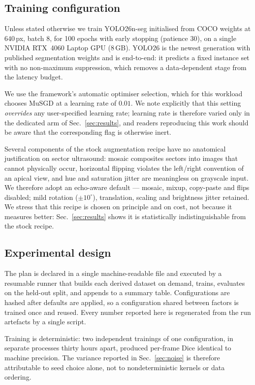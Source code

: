 \subsection{Training configuration}

Unless stated otherwise we train YOLO26n-seg initialised from COCO weights at
$640$\,px, batch 8, for 100 epochs with early stopping (patience 30), on a
single NVIDIA RTX~4060 Laptop GPU (8\,GB). YOLO26 is the newest generation with
published segmentation weights and is end-to-end: it predicts a fixed instance
set with no non-maximum suppression, which removes a data-dependent stage from
the latency budget.

We use the framework's automatic optimiser selection, which for this workload
chooses MuSGD at a learning rate of $0.01$. We note explicitly that this setting
\emph{overrides} any user-specified learning rate; learning rate is therefore
varied only in the dedicated arm of Sec.~\ref{sec:results}, and readers
reproducing this work should be aware that the corresponding flag is otherwise
inert.

Several components of the stock augmentation recipe have no anatomical
justification on sector ultrasound: mosaic composites sectors into images that
cannot physically occur, horizontal flipping violates the left/right convention
of an apical view, and hue and saturation jitter are meaningless on grayscale
input. We therefore adopt an echo-aware default --- mosaic, mixup, copy-paste
and flips disabled; mild rotation ($\pm10^\circ$), translation, scaling and
brightness jitter retained. We stress that this recipe is chosen on principle
and on cost, not because it measures better: Sec.~\ref{sec:results} shows it is
statistically indistinguishable from the stock recipe.

\subsection{Experimental design}

The plan is declared in a single machine-readable file and executed by a
resumable runner that builds each derived dataset on demand, trains, evaluates
on the held-out split, and appends to a summary table. Configurations are hashed
after defaults are applied, so a configuration shared between factors is trained
once and reused. Every number reported here is regenerated from the run
artefacts by a single script.

Training is deterministic: two independent trainings of one configuration, in
separate processes thirty hours apart, produced per-frame Dice identical to
machine precision. The variance reported in Sec.~\ref{sec:noise} is therefore
attributable to seed choice alone, not to nondeterministic kernels or data
ordering.
